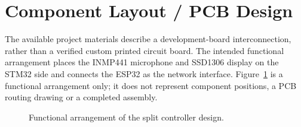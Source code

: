 \section{Component Layout / PCB Design}
\label{sec:layout}
The available project materials describe a development-board interconnection, rather than a verified custom printed circuit board. The intended functional arrangement places the INMP441 microphone and SSD1306 display on the STM32 side and connects the ESP32 as the network interface. Figure~\ref{fig:layout} is a functional arrangement only; it does not represent component positions, a PCB routing drawing or a completed assembly.
\begin{figure}[htbp]
\centering
{}
\caption{Functional arrangement of the split controller design.}
\label{fig:layout}
\end{figure}

